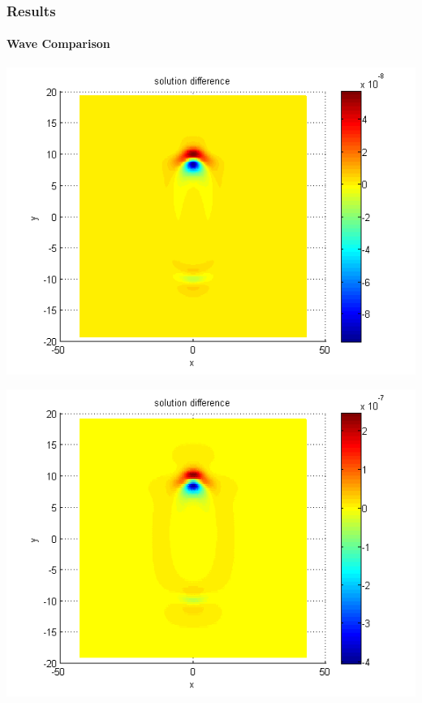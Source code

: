 \documentclass{beamer}
\begin{document}
\begin{frame}
\frametitle{Results}
\framesubtitle{Wave Comparison}
\begin{center}\vspace{0.4cm}
	\begin{minipage}[b]{0.32\linewidth}
		\includegraphics[width=\linewidth]{figures/compare_128_bt1_c09_h010.png}
	\end{minipage}	
	\begin{minipage}[b]{0.32\linewidth}
		\includegraphics[width=\linewidth]{figures/compare_128_bt1_c09_h020.png}
	\end{minipage}	
	\begin{minipage}[b]{0.32\linewidth}

\end{minipage}
\end{center}
\end{frame}
\end{document}
